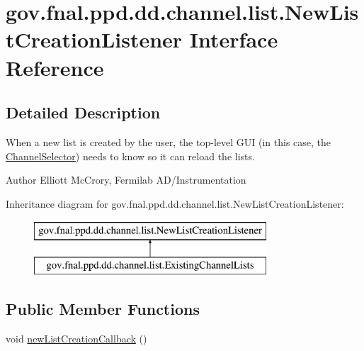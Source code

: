 \hypertarget{interfacegov_1_1fnal_1_1ppd_1_1dd_1_1channel_1_1list_1_1NewListCreationListener}{\section{gov.\-fnal.\-ppd.\-dd.\-channel.\-list.\-New\-List\-Creation\-Listener Interface Reference}
\label{interfacegov_1_1fnal_1_1ppd_1_1dd_1_1channel_1_1list_1_1NewListCreationListener}
}


\subsection{Detailed Description}
When a new list is created by the user, the top-\/level G\-U\-I (in this case, the \hyperlink{classgov_1_1fnal_1_1ppd_1_1dd_1_1ChannelSelector}{Channel\-Selector}) needs to know so it can reload the lists.

\begin{DoxyAuthor}{Author}
Elliott Mc\-Crory, Fermilab A\-D/\-Instrumentation 
\end{DoxyAuthor}
Inheritance diagram for gov.\-fnal.\-ppd.\-dd.\-channel.\-list.\-New\-List\-Creation\-Listener\-:\begin{figure}[H]
\begin{center}
\leavevmode
\includegraphics[height=2.000000cm]{interfacegov_1_1fnal_1_1ppd_1_1dd_1_1channel_1_1list_1_1NewListCreationListener}
\end{center}
\end{figure}
\subsection*{Public Member Functions}
\begin{DoxyCompactItemize}
\item 
void \hyperlink{interfacegov_1_1fnal_1_1ppd_1_1dd_1_1channel_1_1list_1_1NewListCreationListener_a453407f350d9eacded942c7336dd97c5}{new\-List\-Creation\-Callback} ()
\end{DoxyCompactItemize}



